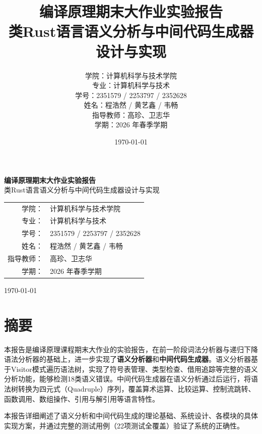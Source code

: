 \documentclass[12pt,a4paper]{ctexart}
\title{\textbf{编译原理期末大作业实验报告}\\[0.5em]
\large 类Rust语言语义分析与中间代码生成器设计与实现}
\author{
    \begin{tabular}{rl}
        学院：& 计算机科学与技术学院 \\
        专业：& 计算机科学与技术 \\
        学号：& 2351579 / 2253797 / 2352628 \\
        姓名：& 程浩然 / 黄艺鑫 / 韦畅 \\
        指导教师：& 高珍、卫志华 \\
        学期：& 2026 年春季学期
    \end{tabular}
}
\date{\today}
\begin{document}
\begin{titlepage}
\centering
\vspace*{\fill}

{\LARGE\textbf{编译原理期末大作业实验报告}\\[1em]
\large 类Rust语言语义分析与中间代码生成器设计与实现}

\vspace{3em}

{\renewcommand{\arraystretch}{1.8}
\begin{tabular}{rl}
    学院：& 计算机科学与技术学院 \\
    专业：& 计算机科学与技术 \\
    学号：& 2351579 / 2253797 / 2352628 \\
    姓名：& 程浩然 / 黄艺鑫 / 韦畅 \\
    指导教师：& 高珍、卫志华 \\
    学期：& 2026 年春季学期
\end{tabular}
}

\vspace{2em}
{\today}

\vspace*{\fill}
\end{titlepage}

\tableofcontents
\newpage

\section*{摘要}

本报告是编译原理课程期末大作业的实验报告，在前一阶段词法分析器与递归下降语法分析器的基础上，进一步实现了\textbf{语义分析器}和\textbf{中间代码生成器}。语义分析器基于Visitor模式遍历语法树，实现了符号表管理、类型检查、借用追踪等完整的语义分析功能，能够检测18类语义错误。中间代码生成器在语义分析通过后运行，将语法树转换为四元式（Quadruple）序列，覆盖算术运算、比较运算、控制流跳转、函数调用、数组操作、引用与解引用等语言特性。

本报告详细阐述了语义分析和中间代码生成的理论基础、系统设计、各模块的具体实现方案，并通过完整的测试用例（22项测试全覆盖）验证了系统的正确性。
\end{document}
